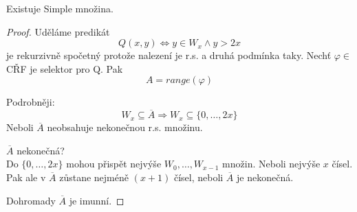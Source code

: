 \begin{theorem}
	Existuje Simple množina.
\end{theorem}
\begin{proof}
	Uděláme predikát
	\[ Q(x, y) \iff y \in W_x \land y > 2x \]
	je rekurzivně spočetný protože nalezení je r.s. a druhá podmínka taky.
	Nechť $\varphi \in $ CŘF je selektor pro Q.
	Pak
	\[ A = range(\varphi) \]

	Podrobněji:
	\[ W_x \subseteq \overline{A} \Rightarrow W_x \subseteq \{ 0, \ldots, 2x \} \]
	Neboli $\overline{A}$ neobsahuje nekonečnou r.s. množinu.

	$\overline{A}$ nekonečná? \\
	Do $\{ 0, \ldots, 2x \}$ mohou přispět nejvýše $W_0, \ldots, W_{x - 1}$ množin.
	Neboli nejvýše $x$ čísel.
	Pak ale v $\overline{A}$ zůstane nejméně $(x + 1)$ čísel, neboli $\overline{A}$ je nekonečná.

	Dohromady $\overline{A}$ je imunní.

\end{proof}
